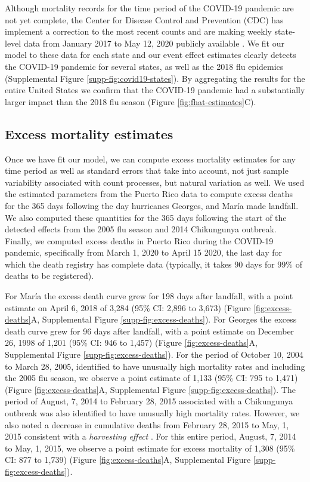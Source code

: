 \documentclass[11pt]{article}
\begin{document}
Although mortality records for the time period of the COVID-19 pandemic are not yet complete, the Center for Disease Control and Prevention (CDC) has implement a correction to the most recent counts and are making weekly state-level data from January 2017 to May 12, 2020 publicly available \cite{cdc2020covid19}. We fit our model to these data for each state and our event effect estimates clearly detects the COVID-19 pandemic for several states, as well as the 2018 flu epidemics (Supplemental Figure \ref{supp-fig:covid19-states}). By aggregating the results for the entire United States we confirm that the COVID-19 pandemic had a substantially larger impact than the 2018 flu season
(Figure \ref{fig:fhat-estimates}C).
 
\subsection{Excess mortality estimates}
\label{subsec:excess-mortality}
Once we have fit our model, we can compute excess mortality estimates for any time period as well as standard errors that take into account, not just sample variability associated with count processes, but natural variation as well. We used the estimated parameters from the Puerto Rico data to compute excess deaths for the 365 days following the day hurricanes Georges, and Mar\'ia made landfall. We also computed these quantities for the 365 days following the start of the detected effects from the 2005 flu season and 2014 Chikungunya outbreak. Finally, we computed excess deaths in Puerto Rico during the COVID-19 pandemic, specifically from March 1, 2020 to April 15 2020, the last day for which the death registry has complete data (typically, it takes 90 days for 99\% of deaths to be registered). 

For Mar\'ia the excess death curve grew for 198 days after landfall, with a point estimate on April 6, 2018 of 3,284 (95\% CI: 2,896 to 3,673) (Figure \ref{fig:excess-deaths}A, Supplemental Figure \ref{supp-fig:excess-deaths}). For Georges the excess death curve grew for 96 days after landfall, with a point estimate on December 26, 1998 of 1,201 (95\% CI: 946 to 1,457)  (Figure \ref{fig:excess-deaths}A, Supplemental Figure \ref{supp-fig:excess-deaths}). For the period of October 10, 2004 to March 28, 2005, identified to have unusually high mortality rates and including the 2005 flu season, we observe a point estimate of 1,133 (95\% CI: 795 to 1,471) (Figure \ref{fig:excess-deaths}A, Supplemental Figure \ref{supp-fig:excess-deaths}). The period of August, 7, 2014 to February 28, 2015 associated with a Chikungunya outbreak was also identified to have unusually high mortality rates. However, we also noted a decrease in cumulative deaths from February 28, 2015 to May, 1, 2015 consistent with a \emph{harvesting effect} \cite{hajat2005mortality, dushoff2006mortality}. For this entire period, August, 7, 2014 to May, 1, 2015, we observe a point estimate for excess mortality of 1,308 (95\% CI: 877 to 1,739) (Figure \ref{fig:excess-deaths}A, Supplemental Figure \ref{supp-fig:excess-deaths}).
\end{document}
